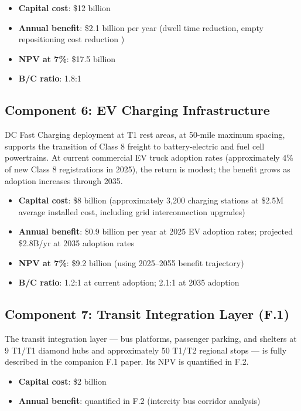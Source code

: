 \begin{itemize}
  \item \textbf{Capital cost}: \$12 billion
  \item \textbf{Annual benefit}: \$2.1 billion per year (dwell time reduction, empty repositioning cost reduction \citep{FHWA_freight2023})
  \item \textbf{NPV at 7\%}: \$17.5 billion
  \item \textbf{B/C ratio}: 1.8:1
\end{itemize}

\subsection{Component 6: EV Charging Infrastructure}

DC Fast Charging deployment at T1 rest areas, at 50-mile maximum spacing, supports the transition of Class 8 freight to battery-electric and fuel cell powertrains. At current commercial EV truck adoption rates (approximately 4\% of new Class 8 registrations in 2025), the return is modest; the benefit grows as adoption increases through 2035.

\begin{itemize}
  \item \textbf{Capital cost}: \$8 billion (approximately 3,200 charging stations at \$2.5M average installed cost, including grid interconnection upgrades)
  \item \textbf{Annual benefit}: \$0.9 billion per year at 2025 EV adoption rates; projected \$2.8B/yr at 2035 adoption rates \citep{FHWA_NHS2023}
  \item \textbf{NPV at 7\%}: \$9.2 billion (using 2025--2055 benefit trajectory)
  \item \textbf{B/C ratio}: 1.2:1 at current adoption; 2.1:1 at 2035 adoption
\end{itemize}

\subsection{Component 7: Transit Integration Layer (F.1)}

The transit integration layer --- bus platforms, passenger parking, and shelters at 9 T1/T1 diamond hubs and approximately 50 T1/T2 regional stops --- is fully described in the companion F.1 paper. Its NPV is quantified in F.2.

\begin{itemize}
  \item \textbf{Capital cost}: \$2 billion
  \item \textbf{Annual benefit}: quantified in F.2 (intercity bus corridor analysis)
\end{itemize}

